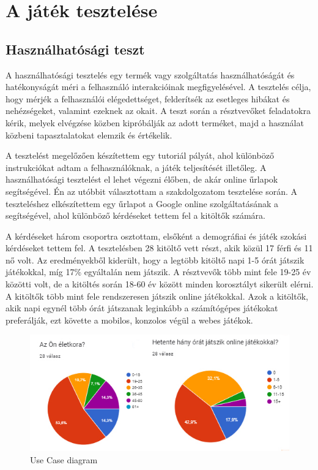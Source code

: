 \documentclass[12pt, a4paper]{report}
\theoremstyle{definition}
\begin{document}
	\chapter{A játék tesztelése}
	
	\section{Használhatósági teszt}
	A használhatósági tesztelés egy termék vagy szolgáltatás használhatóságát és hatékonyságát méri a felhasználó interakcióinak megfigyelésével. A tesztelés célja, hogy mérjék a felhasználói elégedettséget, felderítsék az esetleges hibákat és nehézségeket, valamint ezeknek az okait. A teszt során a résztvevőket feladatokra kérik, melyek elvégzése közben kipróbálják az adott terméket, majd a használat közbeni tapasztalatokat elemzik és értékelik.
	
	A tesztelést megelőzően készítettem egy tutoriál pályát, ahol különböző instrukciókat adtam a felhasználóknak, a játék teljesítését illetőleg. A használhatósági tesztelést el lehet végezni élőben, de akár online űrlapok segítségével. Én az utóbbit választottam a szakdolgozatom tesztelése során. A teszteléshez elkészítettem egy űrlapot a Google online szolgáltatásának a segítségével, ahol különböző kérdéseket tettem fel a kitöltők számára.
	
	A kérdéseket három csoportra osztottam, elsőként a demográfiai és játék szokási kérdéseket tettem fel. A tesztelésben 28 kitöltő vett részt, akik közül 17 férfi és 11 nő volt. Az eredményekből kiderült, hogy a legtöbb kitöltő napi 1-5 órát játszik játékokkal, míg 17\% egyáltalán nem játszik. A résztvevők több mint fele 19-25 év közötti volt, de a kitöltés során 18-60 év között minden korosztályt sikerült elérni. A kitöltők több mint fele rendszeresen játszik online játékokkal. Azok a kitöltők, akik napi egynél több órát játszanak leginkább a számítógépes játékokat preferálják, ezt követte a mobilos, konzolos végül a webes játékok.
	
	\begin{figure}[!h]
		\centering
		\includegraphics[width=1\linewidth]{./images/diagrams.jpg}
		\caption{Use Case diagram}
		\label{fig:usecase}
	\end{figure}	
	
\end{document}
